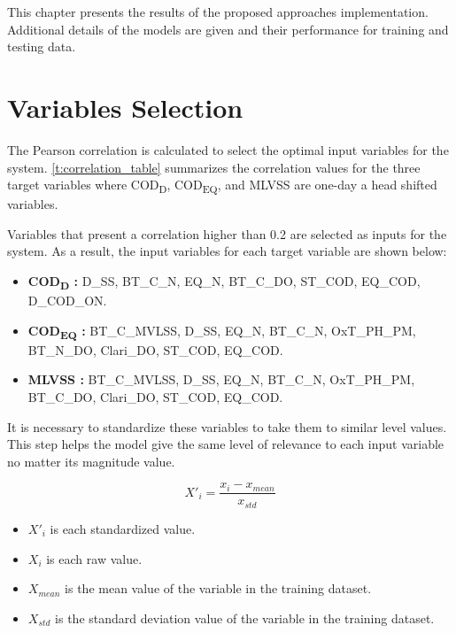 This chapter presents the results of the proposed approaches implementation. Additional details of the models are given and their performance for training and testing data. 

\section{Variables Selection}
\label{s:results_data_selection}

The Pearson correlation is calculated to select the optimal input variables for the system. \autoref{t:correlation_table} summarizes the correlation values for the three target variables where \ac{COD}\textsubscript{D}, \ac{COD}\textsubscript{EQ}, and \ac{MLVSS} are one-day a head shifted variables.



Variables that present a correlation higher than 0.2 are selected as inputs for the system. As a result, the input variables for each target variable are shown below:

\begin{itemize}
    \item \textbf{COD\textsubscript{D} :} D\_SS, BT\_C\_N, EQ\_N, BT\_C\_DO, ST\_COD, EQ\_COD, D\_COD\_ON.
    \item \textbf{COD\textsubscript{EQ} :} BT\_C\_MVLSS, D\_SS, EQ\_N, BT\_C\_N, OxT\_PH\_PM, BT\_N\_DO, Clari\_DO, ST\_COD, EQ\_COD.
    \item \textbf{MLVSS :} BT\_C\_MVLSS, D\_SS, EQ\_N, BT\_C\_N, OxT\_PH\_PM, BT\_C\_DO, Clari\_DO, ST\_COD, EQ\_COD.
\end{itemize}

It is necessary to standardize these variables to take them to similar level values. This step helps the model give the same level of relevance to each input variable no matter its magnitude value.

\begin{equation}
    X'_i = \frac{x_i - x_{mean}}{x_{std}}
\end{equation}

\begin{itemize}
    \item \begin{math}X'_i\end{math} is each standardized value.
    \item \begin{math}X_i\end{math} is each raw value.
    \item \begin{math}X_{mean}\end{math} is the mean value of the variable in the training dataset.
    \item \begin{math}X_{std}\end{math} is the standard deviation value of the variable in the training dataset.
\end{itemize}


